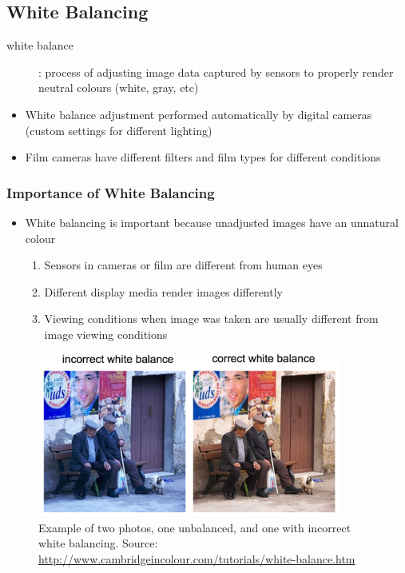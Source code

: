 \documentclass[letterpaper,12pt]{article}
\begin{document}
\subsection{White Balancing}
\begin{description}
 \item[white balance]: process of adjusting image data captured by sensors to properly render neutral colours (white, gray, etc)
\end{description}
\begin{itemize}
 \item White balance adjustment performed automatically by digital cameras (custom settings for different lighting)
 \item Film cameras have different filters and film types for different conditions
\end{itemize}

\subsubsection{Importance of White Balancing}
\begin{itemize}
 \item White balancing is important because unadjusted images have an unnatural colour
       \begin{enumerate}
        \item Sensors in cameras or film are different from human eyes
        \item Different display media render images differently
        \item Viewing conditions when image was taken are usually different from image viewing conditions
       \end{enumerate}
\end{itemize}

\begin{figure}[h!]
 \centering
 \includegraphics[width=10cm]{images/wb.png}
 \caption{Example of two photos, one unbalanced, and one with incorrect white balancing.  Source: \url{http://www.cambridgeincolour.com/tutorials/white-balance.htm}}
\end{figure}
\end{document}

